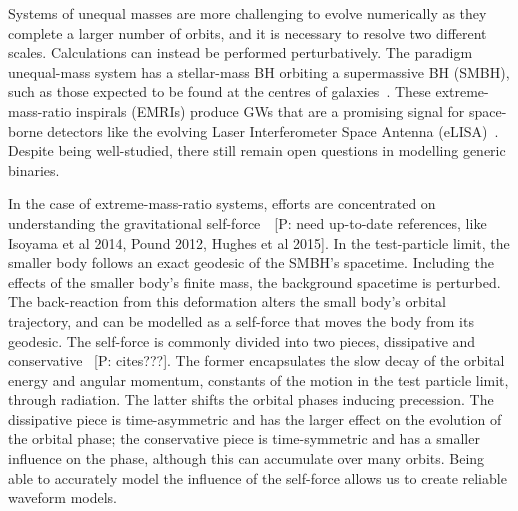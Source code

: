 \documentclass[aps,prd,amsfonts,amssymb,amsmath,nofootinbib,showpacs,superscriptaddress,twocolumn,floatfix]{revtex4-1}
\newcommand{\pcm}[1]{{\color{blue}~\textsf{[P: #1]}}}
\begin{document}
Systems of unequal masses are more challenging to evolve numerically as they complete a larger number of orbits, and it is necessary to resolve two different scales. Calculations can instead be performed perturbatively. The paradigm unequal-mass system has a stellar-mass BH orbiting a supermassive BH (SMBH), such as those expected to be found at the centres of galaxies~\cite{Kormendy1995,Ferrarese2005,Boehle2016}. These extreme-mass-ratio inspirals (EMRIs) produce GWs that are a promising signal for space-borne detectors like the evolving Laser Interferometer Space Antenna (eLISA)~\cite{Amaro-Seoane2007,Amaro-Seoane2012a}. Despite being well-studied, there still remain open questions in modelling generic binaries.

In the case of extreme-mass-ratio systems, efforts are concentrated on understanding the gravitational self-force~\cite{Barack2009,Poisson2004}\pcm{need up-to-date references, like Isoyama et al 2014,  Pound 2012, Hughes et al 2015}. In the test-particle limit, the smaller body follows an exact geodesic of the SMBH's spacetime. Including the effects of the smaller body's finite mass, the background spacetime is perturbed. The back-reaction from this deformation alters the small body's orbital trajectory, and can be modelled as a self-force that moves the body from its geodesic. The self-force is commonly divided into two pieces, dissipative and conservative \pcm{cites???}. The former encapsulates the slow decay of the orbital energy and angular momentum, constants of the motion in the test particle limit, through radiation. The latter shifts the orbital phases inducing precession. The dissipative piece is time-asymmetric and has the larger effect on the evolution of the orbital phase; the conservative piece is time-symmetric and has a smaller influence on the phase, although this can accumulate over many orbits. Being able to accurately model the influence of the self-force allows us to create reliable waveform models.
\end{document}
